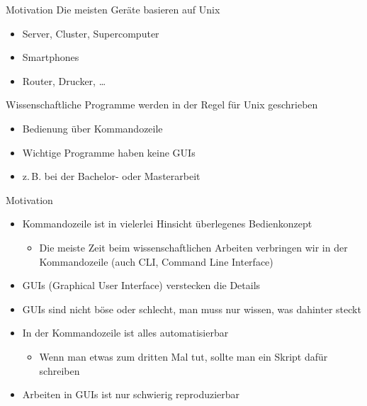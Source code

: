 \tabulinesep=4pt

\begin{frame}{Motivation}
  Die meisten Geräte basieren auf Unix
  \begin{itemize}
    \item Server, Cluster, Supercomputer
    \item Smartphones
    \item Router, Drucker, …
  \end{itemize}
  Wissenschaftliche Programme werden in der Regel für Unix geschrieben
  \begin{itemize}
    \item Bedienung über Kommandozeile
    \item Wichtige Programme haben keine GUIs
    \item z.\,B. bei der Bachelor- oder Masterarbeit
  \end{itemize}
\end{frame}

\begin{frame}{Motivation}
  \begin{itemize}
    \item Kommandozeile ist in vielerlei Hinsicht überlegenes Bedienkonzept
      \begin{itemize}
        \item Die meiste Zeit beim wissenschaftlichen Arbeiten verbringen wir in der Kommandozeile (auch CLI, Command Line Interface)
      \end{itemize}
    \item GUIs (Graphical User Interface) verstecken die Details
    \item GUIs sind nicht böse oder schlecht, man muss nur wissen, was dahinter steckt
    \item In der Kommandozeile ist alles automatisierbar
      \begin{itemize}
        \item Wenn man etwas zum dritten Mal tut, sollte man ein Skript dafür schreiben
      \end{itemize}
    \item Arbeiten in GUIs ist nur schwierig reproduzierbar
  \end{itemize}
\end{frame}

